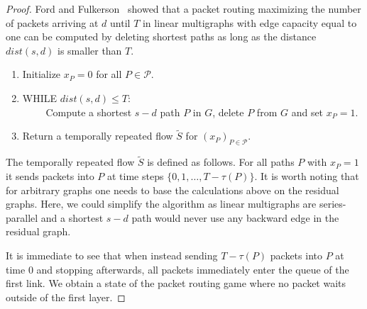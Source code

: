 \satzOptStructure*
\noindent
\begin{proof}
    Ford and Fulkerson~\cite{ford1958constructing} showed that a packet routing maximizing the number of packets arriving at $d$ until $T$ in linear multigraphs with edge capacity equal to one can be computed by deleting shortest paths as long as the distance $dist(s,d)$ is smaller than $T$.
        \begin{enumerate}
        \item Initialize $x_P=0$ for all $P\in \mathcal{P}$.
        \item WHILE $dist(s,d)\leq T$:\\
        $\qquad$ Compute a shortest $s-d$ path $P$ in $G$, delete $P$ from $G$ and set $x_P = 1$.
        \item Return a temporally repeated flow $\tilde{S}$ for $(x_P)_{P\in \mathcal{P}}.$
        \end{enumerate}
    The temporally repeated flow $\tilde{S}$ is defined as follows. For all paths $P$ with $x_P = 1$ it sends packets into $P$ at time steps $\{0, 1, \dots, T-\tau(P)\}$. It is worth noting that for arbitrary graphs one needs to base the calculations above on the residual graphs. Here, we could simplify the algorithm as linear multigraphs are series-parallel and a shortest $s-d$ path would never use any backward edge in the residual graph.
    
    It is immediate to see that when instead sending $T-\tau(P)$ packets into $P$ at time $0$ and stopping afterwards, all packets immediately enter the queue of the first link. We obtain a state of the packet routing game where no packet waits outside of the first layer. 
    

\end{proof}
